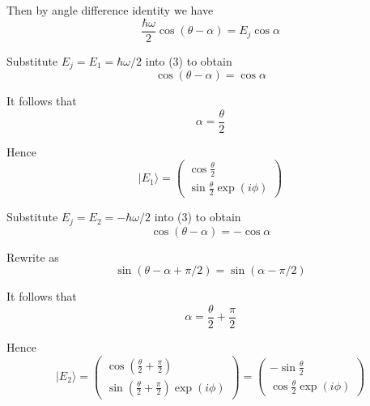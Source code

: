 Then by angle difference identity we have
\begin{equation*}
\frac{\hbar\omega}{2}\cos(\theta-\alpha)=E_j\cos\alpha
\tag{3}
\end{equation*}

Substitute $E_j=E_1=\hbar\omega/2$ into (3) to obtain
\begin{equation*}
\cos(\theta-\alpha)=\cos\alpha
\end{equation*}

It follows that
\begin{equation*}
\alpha=\frac{\theta}{2}
\end{equation*}

Hence
\begin{equation*}
|E_1\rangle=\begin{pmatrix}\cos\frac{\theta}{2}\\[1ex]\sin\frac{\theta}{2}\exp(i\phi)\end{pmatrix}
\end{equation*}

Substitute $E_j=E_2=-\hbar\omega/2$ into (3) to obtain
\begin{equation*}
\cos(\theta-\alpha)=-\cos\alpha
\end{equation*}

Rewrite as
\begin{equation*}
\sin(\theta-\alpha+\pi/2)=\sin(\alpha-\pi/2)
\end{equation*}

It follows that
\begin{equation*}
\alpha=\frac{\theta}{2}+\frac{\pi}{2}
\end{equation*}

Hence
\begin{equation*}
|E_2\rangle=\begin{pmatrix}\cos\left(\frac{\theta}{2}+\frac{\pi}{2}\right)
\\[1ex]
\sin\left(\frac{\theta}{2}+\frac{\pi}{2}\right)\exp(i\phi)
\end{pmatrix}
=\begin{pmatrix}
-\sin\frac{\theta}{2}
\\[1ex]
\cos\frac{\theta}{2}\exp(i\phi)
\end{pmatrix}
\end{equation*}


